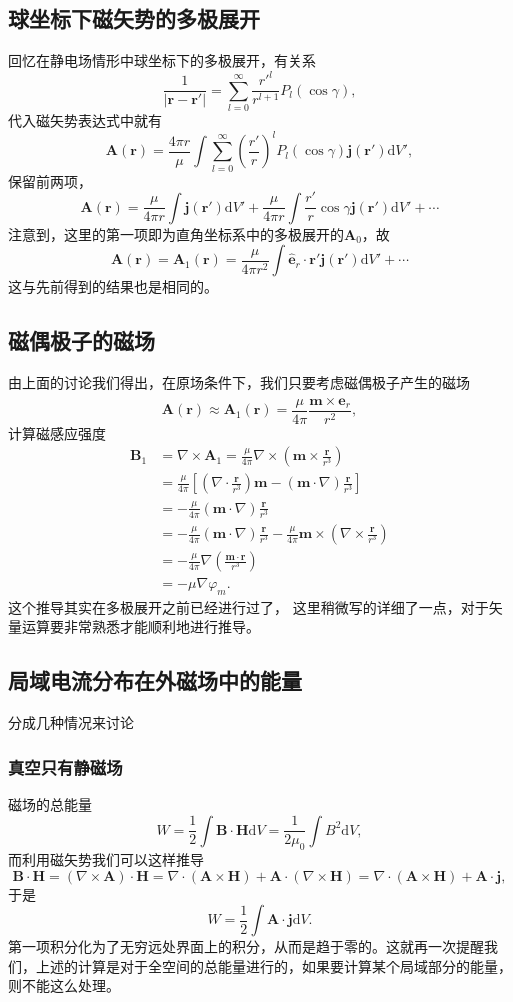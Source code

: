\documentclass[UTF8]{ctexbook}
\renewcommand{\d}{\mathrm{d}}
\renewcommand{\b}{\boldsymbol}
\numberwithin{equation}{chapter}
\begin{document}
	\subsection{球坐标下磁矢势的多极展开}
	回忆在静电场情形中球坐标下的多极展开，有关系
	\[\frac{1}{|\b{r}-\b{r}'|}=\sum_{l=0}^\infty \frac{r'^l}{r^{l+1}}P_l(\cos\gamma),\]
	代入磁矢势表达式中就有
	\[\b{A}(\b{r})=\frac{4\pi r}{\mu}\int \sum_{l=0}^\infty \left(\frac{r'}{r}\right)^lP_l(\cos\gamma)\b{j}(\b{r}')\d V',\]
	保留前两项，
	\[\b{A}(\b{r})=\frac{\mu}{4\pi r}\int \b{j}(\b{r}')\d V' + \frac{\mu}{4\pi r}\int \frac{r'}{r}\cos\gamma\b{j}(\b{r}')\d V' + \cdots\]
	注意到，这里的第一项即为直角坐标系中的多极展开的$\b{A}_0$，故
	\[\b{A}(\b{r})=\b{A}_1(\b{r})=\frac{\mu}{4\pi r^2}\int \hat{\b{e}}_r \cdot\b{r}'\b{j}(\b{r}')\d V'+\cdots\]
	这与先前得到的结果也是相同的。
	
	\subsection{磁偶极子的磁场}
	由上面的讨论我们得出，在原场条件下，我们只要考虑磁偶极子产生的磁场
	\[\b{A}(\b{r})\approx\b{A}_1(\b{r})=\frac{\mu}{4\pi}\frac{\b{m}\times\hat{\b{e}}_r}{r^2},\]
	计算磁感应强度
	\begin{align*}
		\b{B}_1&=\nabla\times\b{A}_1=\frac{\mu}{4\pi}\nabla\times(\b{m}\times\frac{\b{r}}{r^3}) \\
		&=\frac{\mu}{4\pi}\left[\left(\nabla\cdot\frac{\b{r}}{r^3}\right)\b{m}-(\b{m}\cdot\nabla)\frac{\b{r}}{r^3}\right] \\
		&=-\frac{\mu}{4\pi}(\b{m}\cdot\nabla)\frac{\b{r}}{r^3}\\
		&=-\frac{\mu}{4\pi}(\b{m}\cdot\nabla)\frac{\b{r}}{r^3}-\frac{\mu}{4\pi}\b{m}\times\left(\nabla\times\frac{\b{r}}{r^3}\right) \\
		&=-\frac{\mu}{4\pi}\nabla\left(\frac{\b{m}\cdot\b{r}}{r^3}\right) \\
		&=-\mu\nabla\varphi_m.
	\end{align*}
	这个推导其实在多极展开之前已经进行过了， 这里稍微写的详细了一点，对于矢量运算要非常熟悉才能顺利地进行推导。
	
	\subsection{局域电流分布在外磁场中的能量}
	分成几种情况来讨论
	\subsubsection{真空只有静磁场}
	磁场的总能量
	\[W=\frac{1}{2}\int \b{B}\cdot\b{H}\d V=\frac{1}{2\mu_0}\int B^2 \d V,\]
	而利用磁矢势我们可以这样推导
	\[\b{B}\cdot\b{H}=(\nabla\times\b{A})\cdot\b{H}=\nabla\cdot(\b{A}\times\b{H})+\b{A}\cdot(\nabla\times\b{H})=\nabla\cdot(\b{A}\times\b{H})+\b{A}\cdot\b{j},\]
	于是
	\[W=\frac{1}{2}\int \b{A}\cdot\b{j}\d V.\]
	第一项积分化为了无穷远处界面上的积分，从而是趋于零的。这就再一次提醒我们，上述的计算是对于全空间的总能量进行的，如果要计算某个局域部分的能量，则不能这么处理。
	
\end{document}
